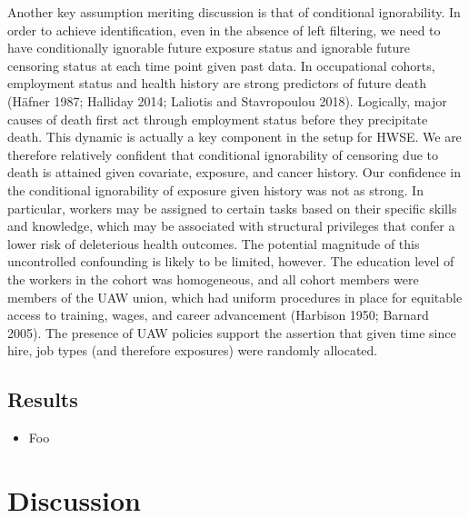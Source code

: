 \documentclass[
  11pt,
]{article}
\providecommand{\tightlist}{%
  \setlength{\itemsep}{0pt}\setlength{\parskip}{0pt}}
\begin{document}
Another key assumption meriting discussion is that of conditional
ignorability. In order to achieve identification, even in the absence of
left filtering, we need to have conditionally ignorable future exposure
status and ignorable future censoring status at each time point given
past data. In occupational cohorts, employment status and health history
are strong predictors of future death (Häfner 1987; Halliday 2014;
Laliotis and Stavropoulou 2018). Logically, major causes of death first
act through employment status before they precipitate death. This
dynamic is actually a key component in the setup for HWSE. We are
therefore relatively confident that conditional ignorability of
censoring due to death is attained given covariate, exposure, and cancer
history. Our confidence in the conditional ignorability of exposure
given history was not as strong. In particular, workers may be assigned
to certain tasks based on their specific skills and knowledge, which may
be associated with structural privileges that confer a lower risk of
deleterious health outcomes. The potential magnitude of this
uncontrolled confounding is likely to be limited, however. The education
level of the workers in the cohort was homogeneous, and all cohort
members were members of the UAW union, which had uniform procedures in
place for equitable access to training, wages, and career advancement
(Harbison 1950; Barnard 2005). The presence of UAW policies support the
assertion that given time since hire, job types (and therefore
exposures) were randomly allocated.

\hypertarget{results-1}{%
\subsection{Results}\label{results-1}}

\begin{itemize}
\tightlist
\item
  Foo
\end{itemize}

\hypertarget{discussion}{%
\section{Discussion}\label{discussion}}
\end{document}

